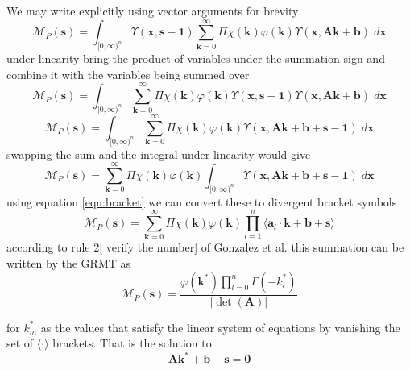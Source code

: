 \documentclass[journal=jcisd8,manuscript=article,layout=onecolumn,pdftex,floatfix,amsmath,amssymb,10pt]{achemso}
\begin{document}
We may write explicitly using vector arguments for brevity
\begin{equation}
\mathcal{M}_P(\mathbf{s}) = \int_{[0,\infty)^{n}} \Upsilon(\mathbf{x},\mathbf{s-1}) \sum_{\mathbf{k}=0}^\infty  \Pi\chi(\mathbf{k})\varphi(\mathbf{k}) \Upsilon(\mathbf{x},\mathbf{A}\mathbf{k}+\mathbf{b}) \; d \mathbf{x}
\end{equation}
under linearity bring the product of variables under the summation sign and combine it with the variables being summed over
\begin{equation}
\mathcal{M}_P(\mathbf{s}) = \int_{[0,\infty)^{n}} \sum_{\mathbf{k}=0}^\infty  \Pi\chi(\mathbf{k})\varphi(\mathbf{k}) \Upsilon(\mathbf{x},\mathbf{s-1}) \Upsilon(\mathbf{x},\mathbf{A}\mathbf{k}+\mathbf{b}) \; d \mathbf{x}
\end{equation}
\begin{equation}
\mathcal{M}_P(\mathbf{s}) = \int_{[0,\infty)^{n}} \sum_{\mathbf{k}=0}^\infty  \Pi\chi(\mathbf{k})\varphi(\mathbf{k})\Upsilon(\mathbf{x},\mathbf{A}\mathbf{k}+\mathbf{b}+\mathbf{s-1}) \; d \mathbf{x}
\end{equation}
swapping the sum and the integral under linearity would give
\begin{equation}
\mathcal{M}_P(\mathbf{s}) = \sum_{\mathbf{k}=0}^\infty  \Pi\chi(\mathbf{k})\varphi(\mathbf{k})\int_{[0,\infty)^{n}} \Upsilon(\mathbf{x},\mathbf{A}\mathbf{k}+\mathbf{b}+\mathbf{s-1}) \; d \mathbf{x}
\end{equation}
using equation \ref{eqn:bracket} we can convert these to divergent bracket symbols
\begin{equation}
\mathcal{M}_P(\mathbf{s}) = \sum_{\mathbf{k}=0}^\infty  \Pi\chi(\mathbf{k})\varphi(\mathbf{k}) \prod_{l=1}^n \langle \mathbf{a}_l \cdot \mathbf{k} + \mathbf{b} + \mathbf{s} \rangle
\end{equation}
according to rule 2[{\color{red} verify the number}] of Gonzalez et al. \cite{} this summation can be written by the GRMT as 
\begin{equation}
\mathcal{M}_P(\mathbf{s}) = \frac{\varphi(\mathbf{k}^*) \prod_{l=0}^n \Gamma(-k_l^*)}{|\det(\mathbf{A})|}
\end{equation}

for $k^*_m$ as the values that satisfy the linear system of equations by vanishing the set of $\langle \cdot \rangle$ brackets. That is the solution to \begin{equation}
\mathbf{A}\mathbf{k}^*+\mathbf{b}+\mathbf{s} = \mathbf{0}
\end{equation} 
\end{document}
